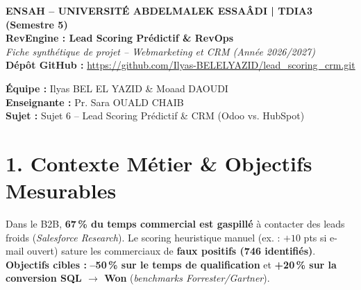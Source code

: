 \documentclass[10pt,a4paper]{article}
\begin{document}
\begin{tcolorbox}[
    colback=lightbg,
    colframe=bordercolor,
    arc=2.5pt,
    boxrule=0.7pt,
    left=6pt, right=6pt, top=3.5pt, bottom=3.5pt
]
\begin{minipage}[c]{0.63\textwidth}
    {\fontsize{7.5}{9}\selectfont\textbf{\color{accent}ENSAH -- UNIVERSITÉ ABDELMALEK ESSAÂDI | TDIA3 (Semestre 5)}}\\[1pt]
    {\fontsize{11.5}{13.5}\selectfont\textbf{\color{primary}RevEngine : Lead Scoring Prédictif \& RevOps}}\\[1pt]
    {\fontsize{7.8}{9.5}\selectfont\textit{Fiche synthétique de projet -- Webmarketing et CRM (Année 2026/2027)}}\\[1pt]
    {\fontsize{7.2}{8.5}\selectfont\textbf{Dépôt GitHub :} \url{https://github.com/Ilyas-BELELYAZID/lead_scoring_crm.git}}
\end{minipage}
\hfill
\begin{minipage}[c]{0.36\textwidth}
    \fontsize{7.2}{9.2}\selectfont
    \textbf{Équipe :} Ilyas BEL EL YAZID \& Moaad DAOUDI\\
    \textbf{Enseignante :} Pr. Sara OUALD CHAIB\\
    \textbf{Sujet :} Sujet 6 -- Lead Scoring Prédictif \& CRM (Odoo vs. HubSpot)
\end{minipage}
\end{tcolorbox}

\vspace{-0.4em}

\section{1. Contexte Métier \& Objectifs Mesurables}
Dans le B2B, \textbf{67\,\% du temps commercial est gaspillé} à contacter des leads froids (\textit{Salesforce Research}). Le scoring heuristique manuel (ex. : $+10$ pts si e-mail ouvert) sature les commerciaux de \textbf{faux positifs (746 identifiés)}.
\textbf{Objectifs cibles :} \textbf{--50\,\% sur le temps de qualification} et \textbf{+20\,\% sur la conversion SQL $\rightarrow$ Won} (\textit{benchmarks Forrester/Gartner}).

\vspace{-0.3em}

\end{document}
